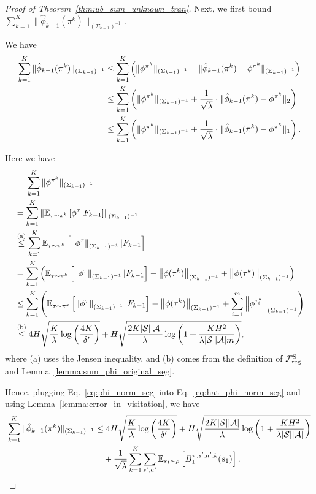 \begin{proof}[Proof of Theorem~\ref{thm:ub_sum_unknown_tran}]
	Next, we first bound $\sum_{k=1}^{K} \|\hat{\phi}_{k-1}(\pi^k)\|_{(\Sigma_{k-1})^{-1}}$.
	
	We have
	\begin{align}
		\sum_{k=1}^{K} \|\hat{\phi}_{k-1}(\pi^k)\|_{(\Sigma_{k-1})^{-1}} &\leq \sum_{k=1}^{K} \left(  \|\phi^{\pi^k}\|_{(\Sigma_{k-1})^{-1}} + \|\hat{\phi}_{k-1}(\pi^k) - \phi^{\pi^k}\|_{(\Sigma_{k-1})^{-1}}  \right)
		\nonumber\\
		&\leq \sum_{k=1}^{K} \left(  \|\phi^{\pi^k}\|_{(\Sigma_{k-1})^{-1}} + \frac{1}{\sqrt{\lambda}} \cdot \|\hat{\phi}_{k-1}(\pi^k) - \phi^{\pi^k}\|_2  \right)
		\nonumber\\
		&\leq \sum_{k=1}^{K} \left(  \|\phi^{\pi^k}\|_{(\Sigma_{k-1})^{-1}} + \frac{1}{\sqrt{\lambda}} \cdot \|\hat{\phi}_{k-1}(\pi^k) - \phi^{\pi^k}\|_1  \right) . \label{eq:hat_phi_norm_seg}
	\end{align}
	
	Here we have
	\begin{align}
		&\quad\ \sum_{k=1}^{K}  \|\phi^{\pi^k}\|_{(\Sigma_{k-1})^{-1}} 
		\nonumber\\
		&= \sum_{k=1}^{K} \nbr{ \ex_{\tau \sim \pi^k}\mbr{\phi^{\tau}| F_{k-1}} }_{(\Sigma_{k-1})^{-1}}
		\nonumber\\
		&\overset{\textup{(a)}}{\leq} \sum_{k=1}^{K} \ex_{\tau \sim \pi^k}\mbr{ \nbr{ \phi^{\tau}}_{(\Sigma_{k-1})^{-1}} | F_{k-1}}
		\nonumber\\
		&= \sum_{k=1}^{K} \sbr{ \ex_{\tau \sim \pi^k}\mbr{ \nbr{ \phi^{\tau}}_{(\Sigma_{k-1})^{-1}} | F_{k-1}} - \nbr{ \phi(\tau^k)}_{(\Sigma_{k-1})^{-1}} + \nbr{ \phi(\tau^k)}_{(\Sigma_{k-1})^{-1}} }
		\nonumber\\
		&\leq \sum_{k=1}^{K} \sbr{ \ex_{\tau \sim \pi^k}\mbr{ \nbr{ \phi^{\tau}}_{(\Sigma_{k-1})^{-1}} | F_{k-1}} - \nbr{ \phi(\tau^k)}_{(\Sigma_{k-1})^{-1}} + \sum_{i=1}^{m} \nbr{ \phi^{\tau^k_i}}_{(\Sigma_{k-1})^{-1}} }
		\nonumber\\
		&\overset{\textup{(b)}}{\leq} 4H\sqrt{ \frac{K}{\lambda} \log\sbr{\frac{4K}{\delta'}} } + H \sqrt{ \frac{2K |\cS| |\cA|}{\lambda} \log \sbr{  1+ \frac{ KH^2 }{ \lambda |\cS| |\cA| m } }} , \label{eq:phi_norm_seg}
	\end{align}
	where (a) uses the Jensen inequality, and (b) comes from the definition of $\mathcal{F}^{\textup{S}}_{\textup{reg}}$ and Lemma~\ref{lemma:sum_phi_original_seg}.
	
	Hence, plugging Eq.~\eqref{eq:phi_norm_seg} into Eq.~\eqref{eq:hat_phi_norm_seg} and using Lemma~\ref{lemma:error_in_visitation}, we have
	\begin{align}
		\sum_{k=1}^{K} \|\hat{\phi}_{k-1}(\pi^k)\|_{(\Sigma_{k-1})^{-1}} &\leq 4H\sqrt{ \frac{K}{\lambda} \log\left( \frac{4K}{\delta'} \right) } + H \sqrt{ \frac{2K |\mathcal{S}| |\mathcal{A}|}{\lambda} \log \left(  1+ \frac{  KH^2 }{ \lambda |\mathcal{S}| |\mathcal{A}| }  \right)} 
		\nonumber\\
		&\quad + \frac{1}{\sqrt{\lambda}} \sum_{k=1}^{K} \sum_{s',a'} \mathbb{E}_{s_1 \sim \rho}\left[ B^{\pi;s',a';k}_1(s_1) \right] . \label{eq:bound_hat_phi_seg}
	\end{align}
	

\end{proof}
